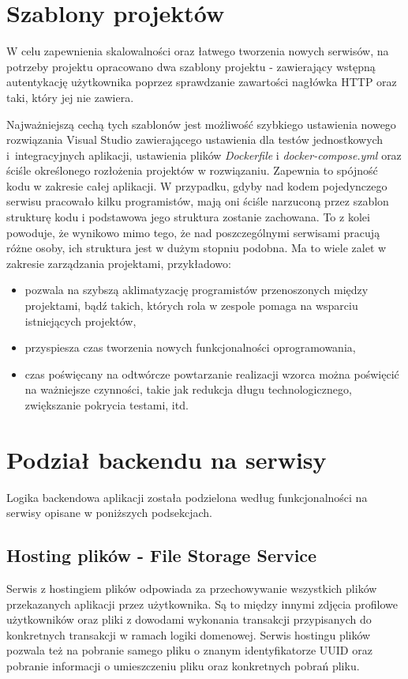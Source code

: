\documentclass{SGGW-thesis}
\begin{document}
\section{Szablony projektów}
W celu zapewnienia skalowalności oraz łatwego tworzenia nowych serwisów, na potrzeby projektu opracowano dwa szablony projektu - zawierający wstępną autentykację użytkownika poprzez sprawdzanie zawartości nagłówka HTTP oraz taki, który jej nie zawiera.

Najważniejszą cechą tych szablonów jest możliwość szybkiego ustawienia nowego rozwiązania Visual Studio zawierającego ustawienia dla testów jednostkowych i~integracyjnych aplikacji, ustawienia plików \textit{Dockerfile} i \textit{docker-compose.yml} oraz ściśle określonego rozłożenia projektów w rozwiązaniu. Zapewnia to spójność kodu w zakresie całej aplikacji. W przypadku, gdyby nad kodem pojedynczego serwisu pracowało kilku programistów, mają oni ściśle narzuconą przez szablon strukturę kodu i podstawowa jego struktura zostanie zachowana. To z kolei powoduje, że wynikowo mimo tego, że nad poszczególnymi serwisami pracują różne osoby, ich struktura jest w dużym stopniu podobna. Ma to wiele zalet w zakresie zarządzania projektami, przykładowo:

\begin{itemize}
	\item pozwala na szybszą aklimatyzację programistów przenoszonych między projektami, bądź takich, których rola w zespole pomaga na wsparciu istniejących projektów,
	\item przyspiesza czas tworzenia nowych funkcjonalności oprogramowania,
	\item czas poświęcany na odtwórcze powtarzanie realizacji wzorca można poświęcić na ważniejsze czynności, takie jak redukcja długu technologicznego, zwiększanie pokrycia testami, itd.
\end{itemize}

\section{Podział backendu na serwisy}
Logika backendowa aplikacji została podzielona według funkcjonalności na serwisy opisane w poniższych podsekcjach.

\subsection{Hosting plików - File Storage Service}
Serwis z hostingiem plików odpowiada za przechowywanie wszystkich plików przekazanych aplikacji przez użytkownika. Są to między innymi zdjęcia profilowe użytkowników oraz pliki z dowodami wykonania transakcji przypisanych do konkretnych transakcji w ramach logiki domenowej. Serwis hostingu plików pozwala też na pobranie samego pliku o znanym identyfikatorze UUID oraz pobranie informacji o umieszczeniu pliku oraz konkretnych pobrań pliku.
\end{document}
